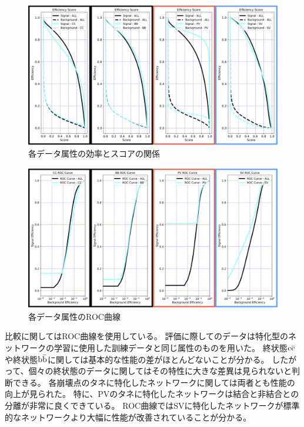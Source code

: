 \begin{figure}[htbp]
 \centering
 \includegraphics[width=1.0\textwidth, clip]{Figure/3Networks/3-4-3-2EfficiencyCurve.png}
 \caption{各データ属性の効率とスコアの関係}
 \label{3-4-3-2EfficiencyCurve}
\end{figure}

\begin{figure}[htbp]
 \centering
 \includegraphics[width=1.0\textwidth, clip]{Figure/3Networks/3-4-3-2ROCCurve.png}
 \caption{各データ属性のROC曲線}
 \label{3-4-3-2ROCCurve}
\end{figure}

比較に関してはROC曲線を使用している。
評価に際してのデータは特化型のネットワークの学習に使用した訓練データと同じ属性のものを用いた。
終状態$\rm c\bar{c}$や終状態$\rm b\bar{b}$に関しては基本的な性能の差がほとんどないことが分かる。
したがって、個々の終状態のデータに関してはその特性に大きな差異は見られないと判断できる。
各崩壊点のタネに特化したネットワークに関しては両者とも性能の向上が見られた。
特に、PVのタネに特化したネットワークは結合と非結合との分離が非常に良くできている。
ROC曲線ではSVに特化したネットワークが標準的なネットワークより大幅に性能が改善されていることが分かる。\\

